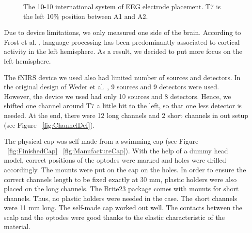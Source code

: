 \begin{figure}[H]
  \centering
  \caption{The 10-10 international system of EEG electrode placement. T7 is the left 10\% position between A1 and A2.}
  \label{fig:tenten}
\end{figure}


Due to device limitations, we only measured one side of the brain. According to Frost et al. \citeyearpar {Frost1999-vs} , language processing has been predominantly associated to cortical activity in the left hemisphere. As a result, we decided to put more focus on the left hemisphere.

The fNIRS device we used also had limited number of sources and detectors. In the original design of Weder et al. \citeyearpar{Weder2018}, 9 sources and 9 detectors were used. However, the device we used had only 10 sources and 8 detectors. Hence, we shifted one channel around T7 a little bit to the left, so that one less detector is needed. At the end, there were 12 long channels and 2 short channels in out setup (see Figure ~\ref{fig:ChannelDef}).

The physical cap was self-made from a swimming cap (see Figure ~\ref {fig:FinishedCap} ~\ref {fig:ManufactureCap}). With the help of a dummy head model, correct positions of the optodes were marked and holes were drilled accordingly. The mounts were put on the cap on the holes. In order to ensure the correct channels length to be fixed exactly at 30 mm, plastic holders were also placed on the long channels. The Brite23 package comes with mounts for short channels. Thus, no plastic holders were needed in the case. The short channels were 11 mm long. The self-made cap worked out well. The contacts between the scalp and the optodes were good thanks to the elastic characteristic of the material.



